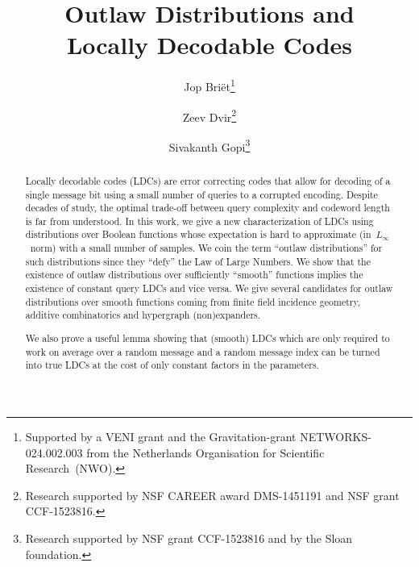 \documentclass{toc}
\begin{document}
\begin{frontmatter} %
  
%
%

%
%

\title{Outlaw Distributions and\\ Locally Decodable Codes}

%
%
%
%
%
%
%
%
%
%
%
%


%
%
%
%

%

\author[briet]{Jop Bri\"{e}t\thanks{Supported by a VENI grant and the Gravitation-grant NETWORKS-024.002.003 from the Netherlands Organisation for Scientific Research~(NWO).}}
\author[dvir]{Zeev Dvir\thanks{Research supported by NSF CAREER award DMS-1451191 and NSF grant CCF-1523816.}}
\author[gopi]{Sivakanth Gopi\thanks{Research supported by NSF grant CCF-1523816 and by the Sloan foundation.}}

%
%
%
%

%
%
%
%
%
%
\begin{abstract}
Locally decodable codes (LDCs) are error correcting codes that allow for decoding of a single message bit using a small number of queries to a corrupted encoding. Despite decades of study, the optimal trade-off between query complexity and codeword length is far from understood.  In this work, we give a new characterization of LDCs  using distributions over Boolean functions whose expectation is hard to approximate (in~$L_\infty$~norm) with a small number of samples. We coin the term ``outlaw distributions'' for such distributions since they ``defy'' the Law of Large Numbers. We show that the existence of outlaw distributions over sufficiently ``smooth'' functions implies the existence of constant query LDCs and vice versa. We give several candidates for outlaw distributions over smooth functions coming from finite field incidence geometry, additive combinatorics and hypergraph (non)expanders.

We also prove a useful lemma showing that (smooth) LDCs which are only required to work on average over a random message and a random message index can be turned into true LDCs at the cost of only constant factors in the parameters.
\end{abstract}

%

\end{frontmatter}
\end{document}
